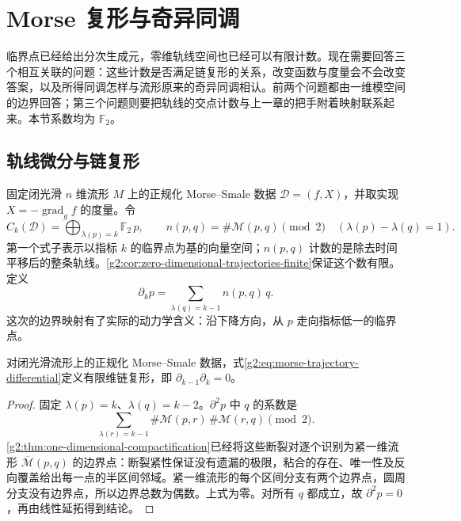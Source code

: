 
% 
% 

\section{Morse 复形与奇异同调}
\label{g2:sec:1804}

临界点已经给出分次生成元，零维轨线空间也已经可以有限计数。现在需要回答三个相互关联的问题：这些计数是否满足链复形的关系，改变函数与度量会不会改变答案，以及所得同调怎样与流形原来的奇异同调相认。前两个问题都由一维模空间的边界回答；第三个问题则要把轨线的交点计数与上一章的把手附着映射联系起来。本节系数均为 \(\mathbb F_2\)。

\subsection{轨线微分与链复形}
\label{g2:subsec:1804:01}

固定闭光滑 \(n\) 维流形 \(M\) 上的正规化 Morse--Smale 数据 \(\mathcal D=(f,X)\)，并取实现 \(X=-\operatorname{grad}_g f\) 的度量。令
\[
	C_k(\mathcal D)=\bigoplus_{\lambda(p)=k}\mathbb F_2\,p,\qquad
	n(p,q)=\#\mathcal M(p,q)\pmod2
	\quad(\lambda(p)-\lambda(q)=1).
\]
第一个式子表示以指标 \(k\) 的临界点为基的向量空间；\(n(p,q)\) 计数的是除去时间平移后的整条轨线。\cref{g2:cor:zero-dimensional-trajectories-finite}保证这个数有限。定义
\begin{equation}\label{g2:eq:morse-trajectory-differential}
	\partial_kp=\sum_{\lambda(q)=k-1}n(p,q)\,q.
\end{equation}
这次的边界映射有了实际的动力学含义：沿下降方向，从 \(p\) 走向指标低一的临界点。

\begin{theorem}\label{g2:thm:morse-differential-square-zero}
	对闭光滑流形上的正规化 Morse--Smale 数据，式\eqref{g2:eq:morse-trajectory-differential}定义有限维链复形，即 \(\partial_{k-1}\partial_k=0\)。
\end{theorem}
\begin{proof}
	固定 \(\lambda(p)=k\)、\(\lambda(q)=k-2\)。\(\partial^2p\) 中 \(q\) 的系数是
	\[
		\sum_{\lambda(r)=k-1}
		\#\mathcal M(p,r)\,\#\mathcal M(r,q)\pmod2.
	\]
	\cref{g2:thm:one-dimensional-compactification}已经将这些断裂对逐个识别为紧一维流形 \(\overline{\mathcal M}(p,q)\) 的边界点：断裂紧性保证没有遗漏的极限，粘合的存在、唯一性及反向覆盖给出每一点的半区间邻域。紧一维流形的每个区间分支有两个边界点，圆周分支没有边界点，所以边界总数为偶数。上式为零。对所有 \(q\) 都成立，故 \(\partial^2p=0\)，再由线性延拓得到结论。
\end{proof}

